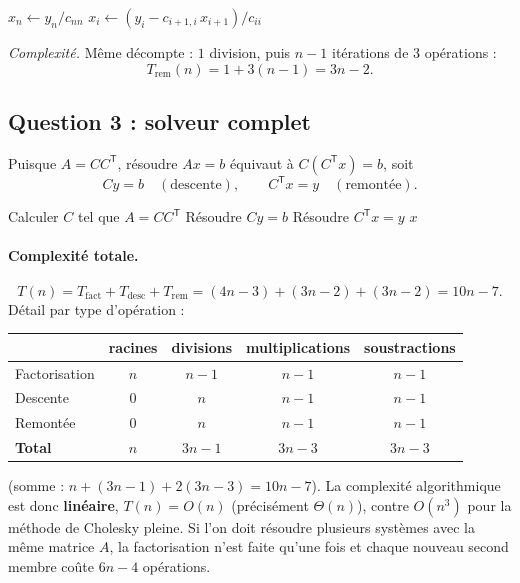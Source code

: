 \documentclass[11pt,a4paper]{article}
\newcommand{\T}{\mathsf{T}}
\begin{document}
\begin{algorithm}[h]
\caption{Remontée $C^\T x=y$}
\begin{algorithmic}[1]
\State $x_n\gets y_n/c_{nn}$
  \State $x_i\gets (y_i-c_{i+1,i}\,x_{i+1})/c_{ii}$
\EndFor
\end{algorithmic}
\end{algorithm}

\emph{Complexité.} Même décompte : $1$ division, puis $n-1$ itérations de $3$ opérations :
\[
T_{\mathrm{rem}}(n)=1+3(n-1)=\boxed{3n-2}.
\]

\subsection{Question 3 : solveur complet}

Puisque $A=CC^\T$, résoudre $Ax=b$ équivaut à $C(C^\T x)=b$, soit
\[
Cy=b\quad(\text{descente}),\qquad C^\T x=y\quad(\text{remontée}).
\]

\begin{algorithm}[h]
\caption{\texttt{solveur\_chol\_tridiag(A,b)}}
\begin{algorithmic}[1]
\State Calculer $C$ tel que $A=CC^\T$ 
\State Résoudre $Cy=b$ 
\State Résoudre $C^\T x=y$ 
\State \Return $x$
\end{algorithmic}
\end{algorithm}

\paragraph{Complexité totale.}
\[
T(n)=T_{\mathrm{fact}}+T_{\mathrm{desc}}+T_{\mathrm{rem}}
=(4n-3)+(3n-2)+(3n-2)=\boxed{10n-7}.
\]
Détail par type d'opération :
\begin{center}
\begin{tabular}{lcccc}
\toprule
 & racines & divisions & multiplications & soustractions\\
\midrule
Factorisation & $n$ & $n-1$ & $n-1$ & $n-1$\\
Descente & $0$ & $n$ & $n-1$ & $n-1$\\
Remontée & $0$ & $n$ & $n-1$ & $n-1$\\
\midrule
\textbf{Total} & $n$ & $3n-1$ & $3n-3$ & $3n-3$\\
\bottomrule
\end{tabular}
\end{center}
(somme : $n+(3n-1)+2(3n-3)=10n-7$). La complexité algorithmique est donc \textbf{linéaire}, $T(n)=O(n)$
(précisément $\Theta(n)$), contre $O(n^3)$ pour la méthode de Cholesky pleine.
Si l'on doit résoudre plusieurs systèmes avec la même matrice $A$, la factorisation n'est faite qu'une fois
et chaque nouveau second membre coûte $6n-4$ opérations.
\end{document}
